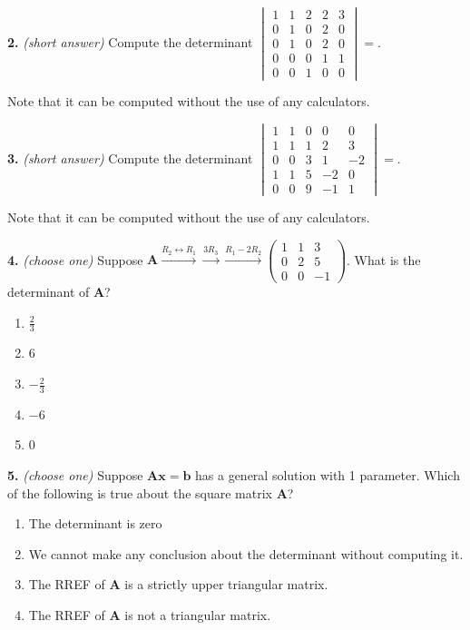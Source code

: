 \documentclass[10pt,a4paper]{article}
\begin{document}
\smallskip
\textbf{2.} \textit{(short answer)} Compute the determinant \(\begin{vmatrix}1&1&2&2&3\\0&1&0&2&0\\0&1&0&2&0\\0&0&0&1&1\\0&0&1&0&0\end{vmatrix}=\).

Note that it can be computed without the use of any calculators.

\smallskip
\textbf{3.} \textit{(short answer)} Compute the determinant \(\begin{vmatrix}1&1&0&0&0\\1&1&1&2&3\\0&0&3&1&-2\\1&1&5&-2&0\\0&0&9&-1&1\end{vmatrix}=\).

Note that it can be computed without the use of any calculators.

\smallskip
\textbf{4.} \textit{(choose one)} Suppose \(\mathbf{A}\xrightarrow{R_2\leftrightarrow R_1}\xrightarrow{3R_3}\xrightarrow{R_1-2R_2}\begin{pmatrix}1&1&3\\0&2&5\\0&0&-1\end{pmatrix}\). What is the determinant of \(\mathbf{A}\)?

\begin{enumerate}[label=(\Alph*)]
\item \(\frac{2}{3}\)
\item \(6\)
\item \(-\frac{2}{3}\)
\item \(-6\)
\item \(0\)
\end{enumerate}
\smallskip
\textbf{5.} \textit{(choose one)} Suppose \(\mathbf{Ax = b}\) has a general solution with 1 parameter. Which of the following is true about the square matrix \(\mathbf{A}\)?

\begin{enumerate}[label=(\Alph*)]
\item The determinant is zero
\item We cannot make any conclusion about the determinant without computing it.
\item The RREF of \(\mathbf{A}\) is a strictly upper triangular matrix.
\item The RREF of \(\mathbf{A}\) is not a triangular matrix.
\end{enumerate}
\smallskip
\end{document}
